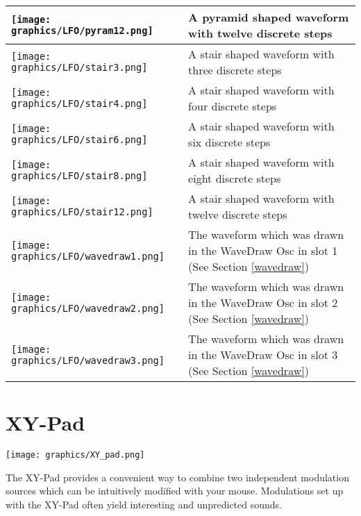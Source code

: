 {\begin{tabular}{| L{0.12\textwidth} | L{0.8\textwidth} |}
        \hline
        \texttt{[image: graphics/LFO/pyram12.png]}   &
        A pyramid shaped waveform with twelve discrete steps\\
        \hline
        \texttt{[image: graphics/LFO/stair3.png]}    &
        A stair shaped waveform with three discrete steps\\
        \hline
        \texttt{[image: graphics/LFO/stair4.png]}    &
        A stair shaped waveform with four discrete steps\\
        \hline
        \texttt{[image: graphics/LFO/stair6.png]}    &
        A stair shaped waveform with six discrete steps\\
        \hline
        \texttt{[image: graphics/LFO/stair8.png]}    &
        A stair shaped waveform with eight discrete steps\\
        \hline
        \texttt{[image: graphics/LFO/stair12.png]}   &
        A stair shaped waveform with twelve discrete steps\\
        \hline
        \texttt{[image: graphics/LFO/wavedraw1.png]} &
        The waveform which was drawn in the WaveDraw Osc in slot 1 (See Section \ref{wavedraw})\\
        \hline
        \texttt{[image: graphics/LFO/wavedraw2.png]} &
        The waveform which was drawn in the WaveDraw Osc in slot 2 (See Section \ref{wavedraw})\\
        \hline
        \texttt{[image: graphics/LFO/wavedraw3.png]} &
        The waveform which was drawn in the WaveDraw Osc in slot 3 (See Section \ref{wavedraw})\\
        \hline
    \end{tabular}
}


\section{XY-Pad}
\label{xy}
\begin{center}
    \texttt{[image: graphics/XY\_pad.png]}
\end{center}

The XY-Pad provides a convenient way to combine two independent modulation sources which can be intuitively modified with your mouse. Modulations set up with the XY-Pad often yield interesting and unpredicted sounds.

